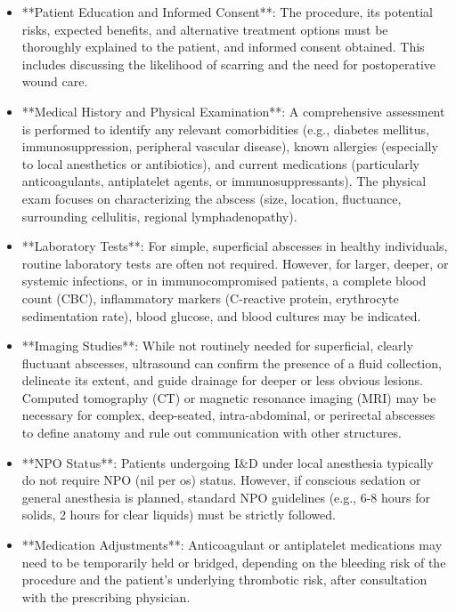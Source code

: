 \begin{itemize}
  \item **Patient Education and Informed Consent**: The procedure, its potential risks, expected benefits, and alternative treatment options must be thoroughly explained to the patient, and informed consent obtained. This includes discussing the likelihood of scarring and the need for postoperative wound care.

  \item **Medical History and Physical Examination**: A comprehensive assessment is performed to identify any relevant comorbidities (e.g., diabetes mellitus, immunosuppression, peripheral vascular disease), known allergies (especially to local anesthetics or antibiotics), and current medications (particularly anticoagulants, antiplatelet agents, or immunosuppressants). The physical exam focuses on characterizing the abscess (size, location, fluctuance, surrounding cellulitis, regional lymphadenopathy).

  \item **Laboratory Tests**: For simple, superficial abscesses in healthy individuals, routine laboratory tests are often not required. However, for larger, deeper, or systemic infections, or in immunocompromised patients, a complete blood count (CBC), inflammatory markers (C-reactive protein, erythrocyte sedimentation rate), blood glucose, and blood cultures may be indicated.

  \item **Imaging Studies**: While not routinely needed for superficial, clearly fluctuant abscesses, ultrasound can confirm the presence of a fluid collection, delineate its extent, and guide drainage for deeper or less obvious lesions. Computed tomography (CT) or magnetic resonance imaging (MRI) may be necessary for complex, deep-seated, intra-abdominal, or perirectal abscesses to define anatomy and rule out communication with other structures.

  \item **NPO Status**: Patients undergoing I\&D under local anesthesia typically do not require NPO (nil per os) status. However, if conscious sedation or general anesthesia is planned, standard NPO guidelines (e.g., 6-8 hours for solids, 2 hours for clear liquids) must be strictly followed.

  \item **Medication Adjustments**: Anticoagulant or antiplatelet medications may need to be temporarily held or bridged, depending on the bleeding risk of the procedure and the patient's underlying thrombotic risk, after consultation with the prescribing physician.


\end{itemize}
